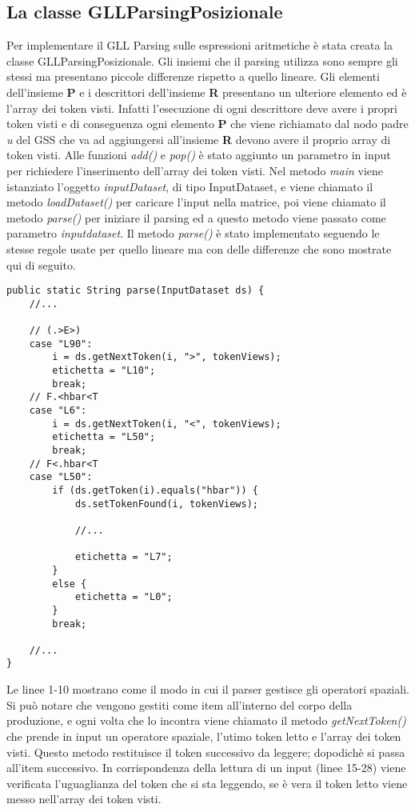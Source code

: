 \subsection{La classe GLLParsingPosizionale}
Per implementare il GLL Parsing sulle espressioni aritmetiche è stata creata la classe GLLParsingPosizionale. Gli insiemi che il parsing utilizza sono sempre gli stessi ma presentano piccole differenze rispetto a quello lineare. Gli elementi dell'insieme \textbf{P} e i descrittori dell'insieme \textbf{R} presentano un ulteriore elemento ed è l'array dei token visti. Infatti l'esecuzione di ogni descrittore deve avere i propri token visti e di conseguenza ogni elemento \textbf{P} che viene richiamato dal nodo padre \textit{u} del GSS che va ad aggiungersi all'insieme \textbf{R} devono avere il proprio array di token visti.  Alle funzioni \textit{add()} e \textit{pop()} è stato aggiunto un parametro in input per richiedere l'inserimento dell'array dei token visti. Nel metodo \textit{main} viene istanziato l'oggetto \textit{inputDataset}, di tipo InputDataset, e viene chiamato il metodo \textit{loadDataset()} per caricare l'input nella matrice, poi viene chiamato il metodo \textit{parse()} per iniziare il parsing ed a questo metodo viene passato come parametro \textit{inputdataset}. Il metodo \textit{parse()} è stato implementato seguendo le stesse regole usate per quello lineare ma con delle differenze che sono mostrate qui di seguito.
\begin{lstlisting}
public static String parse(InputDataset ds) {
	//...
	
	// (.>E>)
	case "L90":
		i = ds.getNextToken(i, ">", tokenViews);
		etichetta = "L10";
		break;
	// F.<hbar<T
	case "L6":
		i = ds.getNextToken(i, "<", tokenViews);
		etichetta = "L50";
		break;
	// F<.hbar<T
	case "L50":
		if (ds.getToken(i).equals("hbar")) {
			ds.setTokenFound(i, tokenViews);
			
			//...
			
			etichetta = "L7";
		} 
		else {
			etichetta = "L0";
		}
		break;
	
	//...
}
\end{lstlisting}
Le linee 1-10 mostrano come il modo in cui il parser gestisce gli operatori spaziali. Si può notare che vengono gestiti come item all'interno del corpo della produzione, e ogni volta che lo incontra viene chiamato il metodo \textit{getNextToken()} che prende in input un operatore spaziale, l'utimo token letto e l'array dei token visti. Questo metodo restituisce il token successivo da leggere; dopodichè si passa all'item successivo. In corrispondenza della lettura di un input (linee 15-28) viene verificata l'uguaglianza del token che si sta leggendo, se è vera il token letto viene messo nell'array dei token visti.

